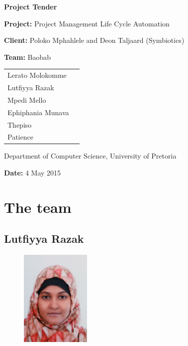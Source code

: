 \documentclass[a4paper,10pt]{article}
\begin{document}
\setlength{\voffset}{-2cm}
\begin{center}


\Huge\textbf{Project Tender\\}							
\vspace{1 cm}

\huge\textbf{Project:} Project Management Life Cycle Automation\newline

\LARGE\textbf{Client:} Poloko Mphahlele and Deon Taljaard (Symbiotics)\newline

\huge\textbf{Team:} Baobab\newline

\begin{tabular}{lr}
Lerato Molokomme\\ 
Lutfiyya Razak\\
Mpedi Mello\\
Ephiphania Munava\\
Thepiso\\
Patience\\

\end{tabular}

\vspace{1cm}
Department of Computer Science, University of Pretoria

\vspace{1cm}
\textbf{Date:} 4 May 2015


\end{center}
\newpage

\tableofcontents
{}
\newpage

\section{The team}
\subsection{Lutfiyya Razak}
\begin{figure}[H]
		\centering
		\includegraphics[width=0.3\textwidth]{pictures/Lutz.jpg}
\end{figure}
\end{document}
